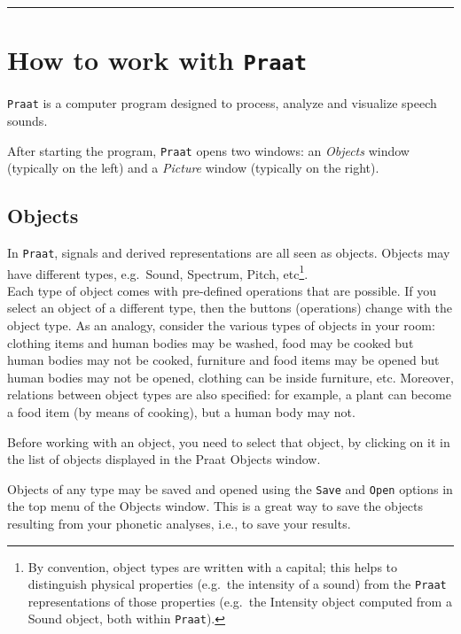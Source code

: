 \documentclass[
]{book}
\begin{document}
\begin{center}\rule{0.5\linewidth}{0.5pt}\end{center}

\label{box-praatintro}
\section{\texorpdfstring{How to work with \texttt{Praat}}{How to work with Praat}}\label{sec:praatintro}

\texttt{Praat} is a computer program designed to process, analyze and visualize speech sounds.

After starting the program, \texttt{Praat} opens two windows: an \emph{Objects} window (typically on the left) and a \emph{Picture} window (typically on the right).

\subsection*{Objects}\label{objects}

In \texttt{Praat}, signals and derived representations are all seen as objects. Objects may have different types, e.g.~Sound, Spectrum, Pitch, etc\footnote{By convention, object types are written with a capital; this helps to distinguish physical properties (e.g.~the intensity of a sound) from the \texttt{Praat} representations of those properties (e.g.~the Intensity object computed from a Sound object, both within \texttt{Praat}).}.\\
Each type of object comes with pre-defined operations that are possible. If you select an object of a different type, then the buttons (operations) change with the object type.
As an analogy, consider the various types of objects in your room: clothing items and human bodies may be washed, food may be cooked but human bodies may not be cooked, furniture and food items may be opened but human bodies may not be opened, clothing can be inside furniture, etc. Moreover, relations between object types are also specified: for example, a plant can become a food item (by means of cooking), but a human body may not.

Before working with an object, you need to select that object, by clicking on it in the list of objects displayed in the Praat Objects window.

Objects of any type may be saved and opened using the \texttt{Save} and \texttt{Open} options in the top menu of the Objects window. This is a great way to save the objects resulting from your phonetic analyses, i.e., to save your results.
\end{document}
